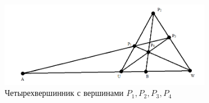 \begin{figure}[H]
  \begin{center}
    \includegraphics[width=0.8\textwidth]{authors/Stepanuk-1-fig-1.png}
  \end{center}
  \caption{Четырехвершинник с вершинами $P_1, P_2, P_3, P_4$}
  \label{fig:Stepanuk-1-fig-1}
\end{figure}
